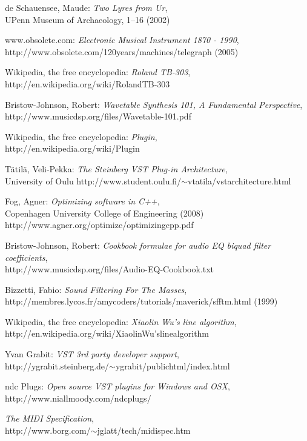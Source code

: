 \begin{flushleft}
\begin{thebibliography}{99}
 de Schauensee, Maude:
\emph{Two Lyres from Ur}, \\
UPenn Museum of Archaeology, 1–16 (2002)

 www.obsolete.com:
\emph{Electronic Musical Instrument 1870 - 1990}, \\
http://www.obsolete.com/120\textunderscore years/machines/telegraph (2005)

 Wikipedia, the free encyclopedia:
\emph{Roland TB-303},\\
http://en.wikipedia.org/wiki/Roland\textunderscore TB-303

 Bristow-Johnson, Robert:
\emph{Wavetable Synthesis 101, A Fundamental Perspective},\\
http://www.musicdsp.org/files/Wavetable-101.pdf

 Wikipedia, the free encyclopedia:
\emph{Plugin},\\
http://en.wikipedia.org/wiki/Plugin

 Tätilä, Veli-Pekka:
\emph{The Steinberg VST Plug-in Architecture},\\
University of Oulu
http://www.student.oulu.fi/$\sim$vtatila/vst\textunderscore architecture.html

 Fog, Agner:
\emph{Optimizing software in C++},\\
Copenhagen University College of Engineering (2008)
http://www.agner.org/optimize/optimizing\textunderscore cpp.pdf

 Bristow-Johnson, Robert:
\emph{Cookbook formulae for audio EQ biquad filter coefficients},\\
http://www.musicdsp.org/files/Audio-EQ-Cookbook.txt

 Bizzetti, Fabio:
\emph{Sound Filtering For The Masses},\\
http://membres.lycos.fr/amycoders/tutorials/maverick/sfftm.html (1999)

 Wikipedia, the free encyclopedia:
\emph{Xiaolin Wu's line algorithm},\\
http://en.wikipedia.org/wiki/Xiaolin\textunderscore Wu's\textunderscore line\textunderscore algorithm

 Yvan Grabit:
\emph{VST 3rd party developer support},\\
http://ygrabit.steinberg.de/$\sim$ygrabit/public\textunderscore html/index.html

 ndc Plugs:
\emph{Open source VST plugins for Windows and OSX},\\
http://www.niallmoody.com/ndcplugs/

\emph{The MIDI Specification},\\
http://www.borg.com/$\sim$jglatt/tech/midispec.htm

\end{thebibliography}
\end{flushleft}

